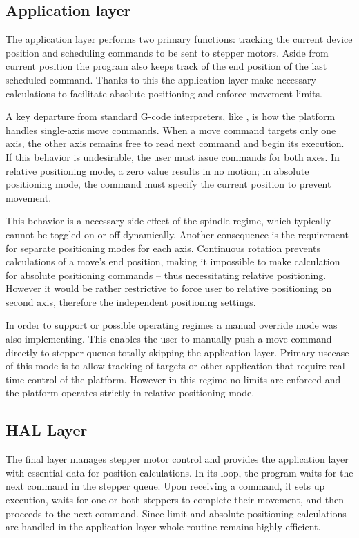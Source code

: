 \subsection{Application layer}

The application layer performs two primary functions: tracking the current device position and scheduling commands to be sent to stepper motors.
Aside from current position the program also keeps track of the end position of the last scheduled command.
Thanks to this the application layer make necessary calculations to facilitate absolute positioning and enforce movement limits.

A key departure from standard G-code interpreters, like \cite{duet}, is how the platform handles single-axis move commands.
When a move command targets only one axis, the other axis remains free to read next command and begin its execution.
If this behavior is undesirable, the user must issue commands for both axes.
In relative positioning mode, a zero value results in no motion; in absolute positioning mode, the command must specify the current position to prevent movement.

This behavior is a necessary side effect of the spindle regime, which typically cannot be toggled on or off dynamically.
Another consequence is the requirement for separate positioning modes for each axis.
Continuous rotation prevents calculations of a move’s end position, making it impossible to make calculation for absolute positioning commands -- thus necessitating relative positioning.
However it would be rather restrictive to force user to relative positioning on second axis, therefore the independent positioning settings.

In order to support or possible operating regimes a manual override mode was also implementing.
This enables the user to manually push a move command directly to stepper queues totally skipping the application layer.
Primary usecase of this mode is to allow tracking of targets or other application that require real time control of the platform.
However in this regime no limits are enforced and the platform operates strictly in relative positioning mode.


\subsection{HAL Layer}

The final layer manages stepper motor control and provides the application layer with essential data for position calculations.
In its loop, the program waits for the next command in the stepper queue.
Upon receiving a command, it sets up execution, waits for one or both steppers to complete their movement, and then proceeds to the next command.
Since limit and absolute positioning calculations are handled in the application layer whole routine remains highly efficient.

